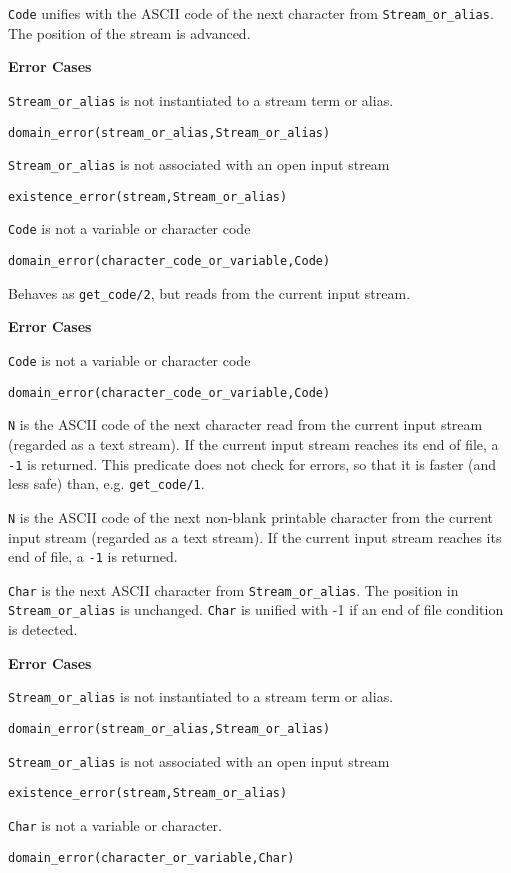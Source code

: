 \begin{description}
   {\tt Code} unifies with the ASCII code of the next character from
   {\tt Stream\_or\_alias}.  The position of the stream is advanced.

{\bf Error Cases}
\bi
\item 	{\tt Stream\_or\_alias} is not instantiated to a stream term or alias.
\bi
\item 	{\tt domain\_error(stream\_or\_alias,Stream\_or\_alias)}
\ei
\item 	{\tt Stream\_or\_alias} is not associated with an open input stream
\bi
\item 	{\tt existence\_error(stream,Stream\_or\_alias)}
\ei
\item 	{\tt Code} is not a variable or character code
\bi
\item 	{\tt domain\_error(character\_code\_or\_variable,Code)}
\ei
\ei

Behaves as {\tt get\_code/2}, but reads from the current input stream.

{\bf Error Cases}
\bi
\item 	{\tt Code} is not a variable or character code
\bi
\item 	{\tt domain\_error(character\_code\_or\_variable,Code)}
\ei
\ei

    {\tt N} is the ASCII code of the next character read from the
    current input stream (regarded as a text stream). If the current
    input stream reaches its end of file, a {\tt -1} is returned.
    This predicate does not check for errors, so that it is faster
    (and less safe) than, e.g. {\tt get\_code/1}.

    {\tt N} is the ASCII code of the next non-blank printable
    character from the current input stream (regarded as a text
    stream).  If the current input stream reaches its end of file, a
    {\tt -1} is returned.


{\tt Char} is the next ASCII character from {\tt Stream\_or\_alias}.
The position in {\tt Stream\_or\_alias} is unchanged.  {\tt Char} is
unified with -1 if an end of file condition is detected.

{\bf Error Cases}
\bi
\item 	{\tt Stream\_or\_alias} is not instantiated to a stream term or alias.
\bi
\item 	{\tt domain\_error(stream\_or\_alias,Stream\_or\_alias)}
\ei
\item 	{\tt Stream\_or\_alias} is not associated with an open input stream
\bi
\item 	{\tt existence\_error(stream,Stream\_or\_alias)}
\ei
\item 	{\tt Char} is not a variable or character.
\bi
\item 	{\tt domain\_error(character\_or\_variable,Char)}
\ei
\ei


\end{description}
